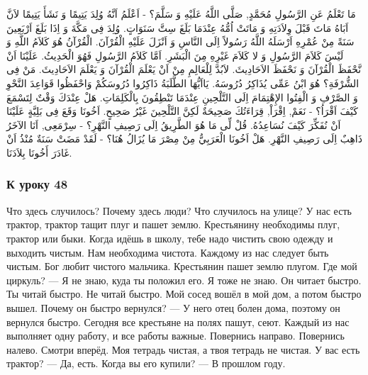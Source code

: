 \documentclass[a5paper]{article}
\begin{document}
مَا تَعْلَمُ عَنِ الرَّسُولِ مُحَمَّدٍ, صَلَّى اللَّهُ عَلَيْهِ وَ سَلَّمَ؟ - اَعْلَمُ اَنَّهُ وُلِدَ يَتِيمًا وَ نَشَأَ يَتِيمًا لاَنَّ اَبَاهُ مَاتَ قَبْلَ وِلاَدَتِهِ وَ مَاتَتْ اُمُّهُ عِنْدَمَا بَلَغَ سِتَّ سَنَوَاتٍ. وُلِدَ فِى مَكَّةَ وَ اِذَا بَلَغَ اَرْبَعِينَ سَنَةً مِنْ عُمْرِهِ اَرْسَلَهُ اللَّهُ رَسُولاً اِلَى النَّاسِ وَ اَنْزَلَ عَلَيْهِ الْقُرْآنَ. الْقُرْآنُ هُوَ كَلاَمُ اللَّهِ وَ لَيْسَ كَلاَمَ الرَّسُولِ وَ لا كَلاَمَ غَيْرِهِ مِنَ الْبَشَرِ. اَمَّا كَلاَمُ الرَّسُولِ فَهُوَ الْحَدِيثُ. عَلَيْنَا اَنْ نَّحْفَظَ الْقُرْآنَ وَ نَحْفَظَ الاَحَادِيثَ. لاَبُدَّ لِلْعَالِمِ مِنْ اَنْ يَعْلَمَ الْقُرْآنَ وَ يَعْلَمَ الاَحَادِيثَ. مَنْ فِى الشُّرْفَةِ؟ هُوَ ابْنُ عَمِّى يُذَاكِرُ دُرُوسَهُ. يَااَيُّهَا الطَّلَبَةُ ذَاكِرُوا دُرُوسَكُمْ وَاحْفَظُوا قَوَاعِدَ النَّحْوِ وَ الصَّرْفِ وَ الْفِتُوا الإِهْتِمَامَ اِلَى التَّلْحِينِ عِنْدَمَا تَنْطِقُونَ بِالْكَلِمَاتِ. هَلْ عِنْدَكَ وَقْتٌ لِتَسْمَعَ كَيْفَ اَقْرَاُ؟ - نَعَمْ, اِقْرَاْ, قِرَاءَتُكَ صَحِيحَةٌ لَكِنَّ التَّلْحِينَ غَيْرُ صَحِيحٍ. اَخُونَا وَقَعَ فِى بَلِيَّةٍ عَلَيْنَا اَنْ نُفَكِّرَ كَيْفَ نُسَاعِدُهُ. قُلْ لِّى مَا هُوَ الطَّرِيقُ اِلَى رَصِيفِ النَّهْرِ؟ - سِرْمَعِى, اَنَا الآخَرُ ذَاهِبٌ اِلَى رَصِيفِ النَّهْرِ. هَلْ اَخُونَا الْعَرَبِيُّ مِنْ مِصْرَ مَا يُزَالُ هُنَا؟ - لَقَدْ مَضَتْ سَنَةٌ مُنْذُ اَنْ غَادَرَ أَخُونَا بِلاَدَنَا.

\subsubsection{К уроку 48}
Что здесь случилось? Почему здесь люди? Что случилось на улице? У нас есть трактор, трактор тащит плуг и пашет землю. Крестьянину необходимы плуг, трактор или быки. Когда идёшь в школу, тебе надо чистить свою одежду и выходить чистым. Нам необходима чистота. Каждому из нас следует быть чистым. Бог любит чистого мальчика. Крестьянин пашет землю плугом. Где мой циркуль? — Я не знаю, куда ты положил его. Я тоже не знаю. Он читает быстро. Ты читай быстро. Не читай быстро. Мой сосед вошёл в мой дом, а потом быстро вышел. Почему он быстро вернулся? — У него отец болен дома, поэтому он вернулся быстро. Сегодня все крестьяне на полях пашут, сеют. Каждый из нас выполняет одну работу, и все работы важные. Повернись направо. Повернись налево. Смотри вперёд. Моя тетрадь чистая, а твоя тетрадь не чистая. У вас есть трактор? — Да, есть. Когда вы его купили? — В прошлом году.
\end{document}
